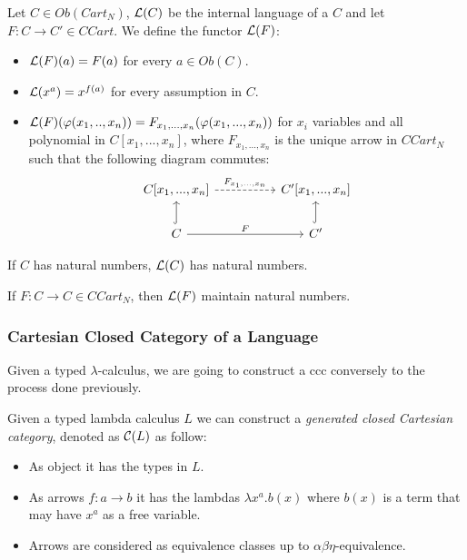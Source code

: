 \begin{definition}
 \begin{proposition}
   Let $C\in Ob(Cart_N)$, $\mathcal{L} (C)$ be the internal language of a $C$ and let $F:C\to C'\in CCart$.  We define the functor $\mathcal{L} (F)$:
   \begin{itemize}
   \item $\mathcal{L} (F) (a) = F(a)$ for every $a\in Ob(C)$.
   \item $\mathcal{L} (x^a) = x^{f(a)}$ for every assumption in $C$.
   \item $\mathcal{L} (F) (\varphi(x_1,..,x_n)) = F_{x_1,...,x_n}(\varphi(x_1,...,x_n))$ for $x_i$ variables and all  polynomial in $C[x_1,...,x_n]$, where $F_{x_1,...,x_n}$ is the unique arrow in $CCart_N$  such that the following diagram commutes:
     \[
       \begin{tikzcd}
         C[x_1,...,x_n]\arrow[dashed]{rr}{F_{x_1,...,x_n}}&& C'[x_1,...,x_n]\\
         C \arrow{rr}{F}\arrow[hookrightarrow]{u}{}&& C'\arrow[hookrightarrow]{u}{}
       \end{tikzcd}
     \]
     
   \end{itemize}
 \end{proposition}

 \begin{proposition}
   If $C$ has natural numbers, $\mathcal{L} (C)$ has natural numbers. 
 \end{proposition}
 \begin{proposition}
   If $F: C\to C \in CCart_N$, then $\mathcal{L} (F)$ maintain natural numbers.
 \end{proposition}
 \subsubsection{Cartesian Closed Category of a Language}

 Given a typed $\lambda$-calculus, we are going to construct a ccc conversely to the process done previously.

 \begin{definition}
   Given a typed lambda calculus $L$ we can construct a \emph{generated closed Cartesian category}, denoted as $\mathcal{C} (L)$ as follow:
   \begin{itemize}
   \item As object it has the types in $L$.
   \item As arrows $f:a\to b$ it has the lambdas $\lambda x^a. b(x)$ where $b(x)$ is a term that may have $x^a$ as a free variable.
   \item Arrows are considered as equivalence classes up to $\alpha\beta\eta$-equivalence.
   \end{itemize}
 \end{definition}


\end{definition}
